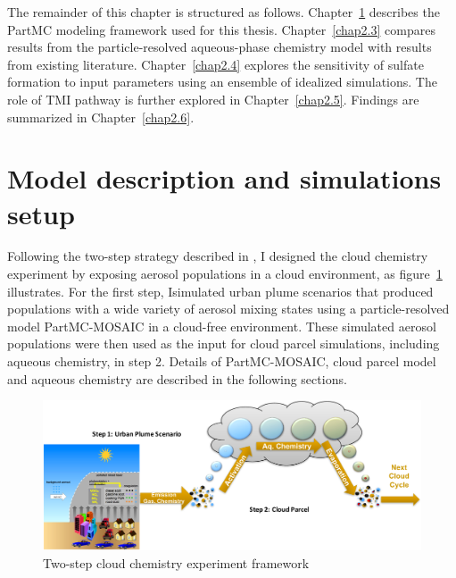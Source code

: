 \documentclass[edeposit,fullpage]{uiucthesis2009}
\begin{document}
The remainder of this chapter is structured as
follows. Chapter~\ref{chap2.2} describes the PartMC modeling framework
used for this thesis. Chapter~\ref{chap2.3} compares results from the
particle-resolved aqueous-phase chemistry model with results from
existing literature. Chapter~\ref{chap2.4} explores the sensitivity of
sulfate formation to input parameters using an ensemble of idealized
simulations. The role of TMI pathway is further explored in
Chapter~\ref{chap2.5}. Findings are summarized in
Chapter~\ref{chap2.6}.

\section{Model description and simulations setup}
\label{chap2.2}
Following the two-step strategy described in \citet{ching2012impacts},
I designed the cloud chemistry experiment by exposing aerosol
populations in a cloud environment, as figure~\ref{chap2-fig1-frame}
illustrates. For the first step, Isimulated urban plume scenarios that
produced populations with a wide variety of aerosol mixing states
using a particle-resolved model PartMC-MOSAIC in a cloud-free
environment. These simulated aerosol populations were then used as the
input for cloud parcel simulations, including aqueous chemistry, in
step 2. Details of PartMC-MOSAIC, cloud parcel model and aqueous
chemistry are described in the following sections.

\begin{figure}[ht]
    \centering 
    \includegraphics[scale=0.4]{chap2_figs/chap2-fig1-frame.pdf}
    \caption{Two-step cloud chemistry experiment framework}
    \label{chap2-fig1-frame}
\end{figure}
\end{document}
